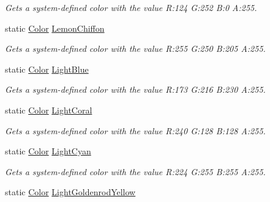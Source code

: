 \begin{DoxyCompactItemize}
\begin{DoxyCompactList}\small\item\em Gets a system-\/defined color with the value R\+:124 G\+:252 B\+:0 A\+:255.\end{DoxyCompactList}\item 
static \hyperlink{structMicrosoft_1_1Xna_1_1Framework_1_1Color}{Color} \hyperlink{structMicrosoft_1_1Xna_1_1Framework_1_1Color_abe9046dd36610ee0b22efdb725e3c7e7}{Lemon\+Chiffon}
\begin{DoxyCompactList}\small\item\em Gets a system-\/defined color with the value R\+:255 G\+:250 B\+:205 A\+:255.\end{DoxyCompactList}\item 
static \hyperlink{structMicrosoft_1_1Xna_1_1Framework_1_1Color}{Color} \hyperlink{structMicrosoft_1_1Xna_1_1Framework_1_1Color_a30da650b32f5eb1996e4413609a7dc7d}{Light\+Blue}
\begin{DoxyCompactList}\small\item\em Gets a system-\/defined color with the value R\+:173 G\+:216 B\+:230 A\+:255.\end{DoxyCompactList}\item 
static \hyperlink{structMicrosoft_1_1Xna_1_1Framework_1_1Color}{Color} \hyperlink{structMicrosoft_1_1Xna_1_1Framework_1_1Color_a1bdfe7f6958a1a3944620845d21c5b51}{Light\+Coral}
\begin{DoxyCompactList}\small\item\em Gets a system-\/defined color with the value R\+:240 G\+:128 B\+:128 A\+:255.\end{DoxyCompactList}\item 
static \hyperlink{structMicrosoft_1_1Xna_1_1Framework_1_1Color}{Color} \hyperlink{structMicrosoft_1_1Xna_1_1Framework_1_1Color_af1c88073071576bdd88bada695c2723d}{Light\+Cyan}
\begin{DoxyCompactList}\small\item\em Gets a system-\/defined color with the value R\+:224 G\+:255 B\+:255 A\+:255.\end{DoxyCompactList}\item 
static \hyperlink{structMicrosoft_1_1Xna_1_1Framework_1_1Color}{Color} \hyperlink{structMicrosoft_1_1Xna_1_1Framework_1_1Color_a46118860269125b52e5e8354fa6dc886}{Light\+Goldenrod\+Yellow}

\end{DoxyCompactItemize}
